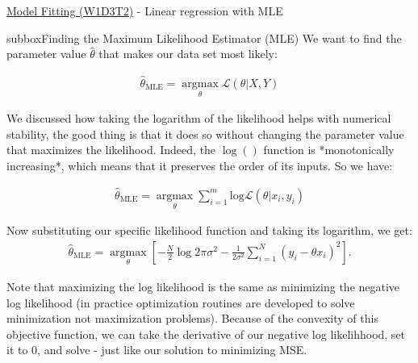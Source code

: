 \begin{textbox}{\href{https://compneuro.neuromatch.io/tutorials/W1D3_ModelFitting/student/W1D3_Tutorial2.html}{Model Fitting (W1D3T2)} -  Linear regression with MLE}
\begin{subbox}{subbox}{Finding the Maximum Likelihood Estimator (MLE)}
\scriptsize
We want to find the parameter value $\hat\theta$ that makes our data set most likely:

\begin{align}
\hat{\theta}_{\textrm{MLE}} = \underset{\theta}{\operatorname{argmax}} \mathcal{L}(\theta|X,Y) 
\end{align}

We discussed how taking the logarithm of the likelihood helps with numerical stability, the good thing is that it does so without changing the parameter value that maximizes the likelihood. Indeed, the $\log()$ function is *monotonically increasing*, which means that it preserves the order of its inputs. So we have:

\begin{align}
\hat{\theta}_{\textrm{MLE}} = \underset{\theta}{\operatorname{argmax}} \sum_{i=1}^m \textrm{log} \mathcal{L}(\theta|x_i,y_i) 
\end{align}

Now substituting our specific likelihood function and taking its logarithm, we get:
\begin{align}
\hat{\theta}_{\textrm{MLE}} = \underset{\theta}{\operatorname{argmax}} [-\frac{N}{2} \operatorname{log} 2\pi\sigma^2 - \frac{1}{2\sigma^2}\sum_{i=1}^N (y_i-\theta x_i)^2].
\end{align}

Note that maximizing the log likelihood is the same as minimizing the negative log likelihood (in practice optimization routines are developed to solve minimization not maximization problems). Because of the convexity of this objective function, we can take the derivative of our negative log likelihhood, set it to 0, and solve - just like our solution to minimizing MSE.


\end{subbox}
\end{textbox}
